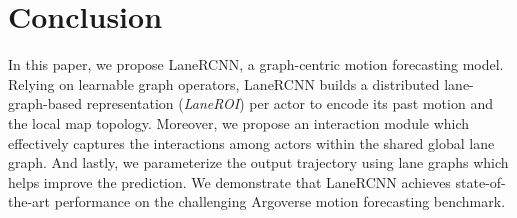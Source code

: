 
\section{Conclusion}

In this paper, we propose LaneRCNN, a graph-centric motion forecasting model.
Relying on learnable graph operators, LaneRCNN builds a distributed lane-graph-based
representation (\textit{LaneROI}) per actor to encode its past motion and the local map topology.
Moreover, we propose an interaction module which effectively captures the interactions among actors within the shared global lane graph.
And lastly, we parameterize the output trajectory using lane graphs which helps improve the prediction.
We demonstrate that LaneRCNN achieves state-of-the-art performance on the challenging Argoverse motion forecasting benchmark.
